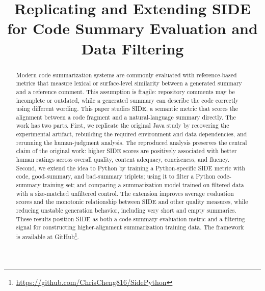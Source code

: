 \documentclass[conference]{IEEEtran}
\begin{document}
\title{Replicating and Extending SIDE for Code Summary Evaluation and Data Filtering\\}

\author{
}
\maketitle

\begin{abstract}
Modern code summarization systems are commonly evaluated with reference-based metrics that measure lexical or surface-level similarity between a generated summary and a reference comment. This assumption is fragile: repository comments may be incomplete or outdated, while a generated summary can describe the code correctly using different wording. This paper studies SIDE, a semantic metric that scores the alignment between a code fragment and a natural-language summary directly. The work has two parts. First, we replicate the original Java study by recovering the experimental artifact, rebuilding the required environment and data dependencies, and rerunning the human-judgment analysis. The reproduced analysis preserves the central claim of the original work: higher SIDE scores are positively associated with better human ratings across overall quality, content adequacy, conciseness, and fluency. Second, we extend the idea to Python by training a Python-specific SIDE metric with code, good-summary, and bad-summary triplets; using it to filter a Python code-summary training set; and comparing a summarization model trained on filtered data with a size-matched unfiltered control. The extension improves average evaluation scores and the monotonic relationship between SIDE and other quality measures, while reducing unstable generation behavior, including very short and empty summaries. These results position SIDE as both a code-summary evaluation metric and a filtering signal for constructing higher-alignment summarization training data. The framework is available at GitHub\footnote{\url{https://github.com/ChrisCheng816/SidePython}}.
\end{abstract}
\end{document}
